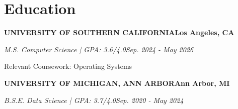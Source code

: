\documentclass[10pt]{article}
\renewcommand{\note}[1]{#1\par}
\newcommand{\school}[4]{%
  \vspace{2pt}%
  \textbf{\MakeUppercase{#1}}\hfill\textbf{#2}\par
  \vspace{0.5pt}%
  \textit{#3}\hfill\textit{#4}\par
}
\begin{document}
\section{Education}
\vspace{-2pt}
\school{University of Southern California}{Los Angeles, CA}{M.S. Computer Science | GPA: 3.6/4.0}{Sep. 2024 - May 2026}
\note{Relevant Coursework: Operating Systems}

\school{University of Michigan, Ann Arbor}{Ann Arbor, MI}{B.S.E. Data Science | GPA: 3.7/4.0}{Sep. 2020 - May 2024}
\end{document}
